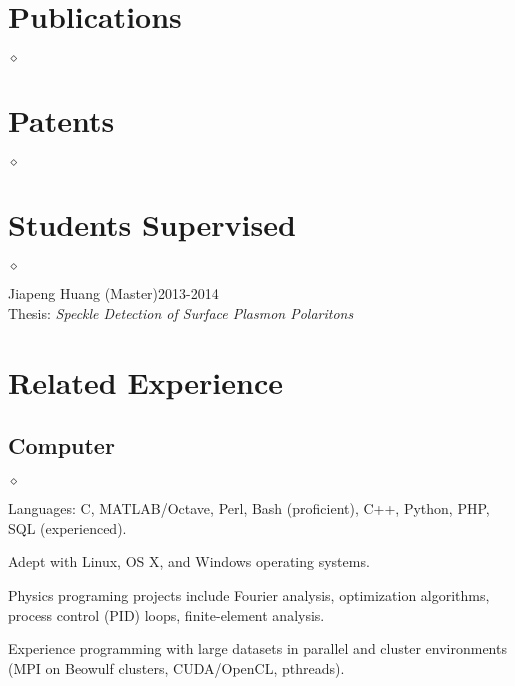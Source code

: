 \documentclass{webster-resume}
\newenvironment{list3}{
  \begin{list}{$\diamond$}{%
      \setlength{\itemsep}{-0.05in}
      \setlength{\parsep}{.05in} \setlength{\parskip}{0in}
      \setlength{\topsep}{0in} \setlength{\partopsep}{0in} 
      \setlength{\leftmargin}{0.2in}}}{\end{list}}
\begin{document}
\vspace{-1em}
\section{Publications}
\vspace{-0.25em}
\begin{list3}
\item {}
\item {}
\end{list3}

\vspace{-1em}
\section{Patents}
\vspace{-0.25em}
\begin{list3}
\item {}
\end{list3}

\vspace{-1em}
\section{Students Supervised}
\begin{list3}
\item Jiapeng Huang (Master)\hfill2013-2014\\
\hspace*{1em}Thesis: {\em Speckle Detection of Surface Plasmon Polaritons}
\end{list3}

\vspace{-1em}
\section{Related Experience}
\vspace{-0.25em}
\subsection{Computer}
\begin{list3}
\item Languages: C, MATLAB/Octave, Perl, Bash (proficient),
C++, Python, PHP, SQL (experienced).
\item Adept with Linux, OS X, and Windows operating systems. 
\item Physics programing projects include Fourier analysis,
optimization algorithms, process control (PID) loops, finite-element analysis.
\item Experience programming with large datasets in parallel and cluster
 environments (MPI on Beowulf clusters, CUDA/OpenCL, pthreads).
\end{list3}
\vspace{-1em}
\end{document}
